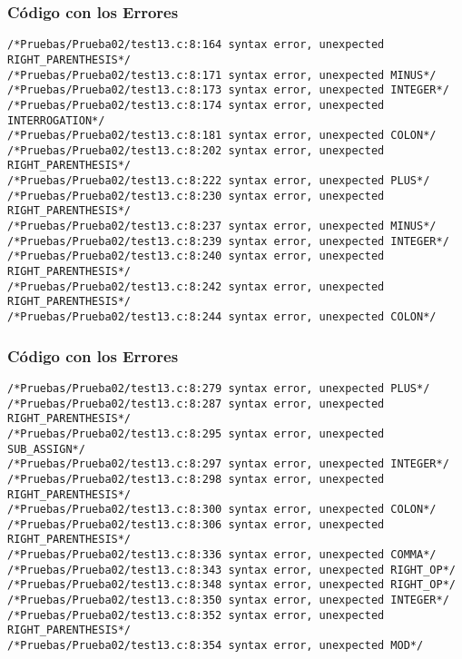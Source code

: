 \documentclass{beamer}
\begin{document}
\begin{frame}[fragile]
\frametitle{C\'odigo con los Errores}
\begin{verbatim}
/*Pruebas/Prueba02/test13.c:8:164 syntax error, unexpected RIGHT_PARENTHESIS*/
/*Pruebas/Prueba02/test13.c:8:171 syntax error, unexpected MINUS*/
/*Pruebas/Prueba02/test13.c:8:173 syntax error, unexpected INTEGER*/
/*Pruebas/Prueba02/test13.c:8:174 syntax error, unexpected INTERROGATION*/
/*Pruebas/Prueba02/test13.c:8:181 syntax error, unexpected COLON*/
/*Pruebas/Prueba02/test13.c:8:202 syntax error, unexpected RIGHT_PARENTHESIS*/
/*Pruebas/Prueba02/test13.c:8:222 syntax error, unexpected PLUS*/
/*Pruebas/Prueba02/test13.c:8:230 syntax error, unexpected RIGHT_PARENTHESIS*/
/*Pruebas/Prueba02/test13.c:8:237 syntax error, unexpected MINUS*/
/*Pruebas/Prueba02/test13.c:8:239 syntax error, unexpected INTEGER*/
/*Pruebas/Prueba02/test13.c:8:240 syntax error, unexpected RIGHT_PARENTHESIS*/
/*Pruebas/Prueba02/test13.c:8:242 syntax error, unexpected RIGHT_PARENTHESIS*/
/*Pruebas/Prueba02/test13.c:8:244 syntax error, unexpected COLON*/
\end{verbatim}
\end{frame}
\begin{frame}[fragile]
\frametitle{C\'odigo con los Errores}
\begin{verbatim}
/*Pruebas/Prueba02/test13.c:8:279 syntax error, unexpected PLUS*/
/*Pruebas/Prueba02/test13.c:8:287 syntax error, unexpected RIGHT_PARENTHESIS*/
/*Pruebas/Prueba02/test13.c:8:295 syntax error, unexpected SUB_ASSIGN*/
/*Pruebas/Prueba02/test13.c:8:297 syntax error, unexpected INTEGER*/
/*Pruebas/Prueba02/test13.c:8:298 syntax error, unexpected RIGHT_PARENTHESIS*/
/*Pruebas/Prueba02/test13.c:8:300 syntax error, unexpected COLON*/
/*Pruebas/Prueba02/test13.c:8:306 syntax error, unexpected RIGHT_PARENTHESIS*/
/*Pruebas/Prueba02/test13.c:8:336 syntax error, unexpected COMMA*/
/*Pruebas/Prueba02/test13.c:8:343 syntax error, unexpected RIGHT_OP*/
/*Pruebas/Prueba02/test13.c:8:348 syntax error, unexpected RIGHT_OP*/
/*Pruebas/Prueba02/test13.c:8:350 syntax error, unexpected INTEGER*/
/*Pruebas/Prueba02/test13.c:8:352 syntax error, unexpected RIGHT_PARENTHESIS*/
/*Pruebas/Prueba02/test13.c:8:354 syntax error, unexpected MOD*/
\end{verbatim}
\end{frame}
\end{document}
